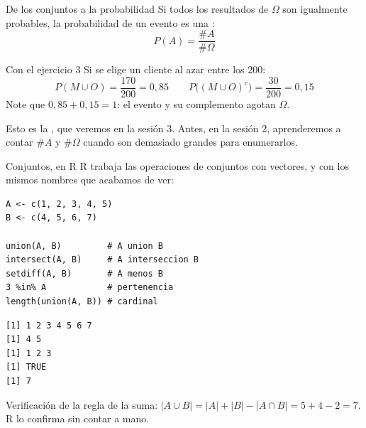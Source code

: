 \documentclass[aspectratio=169,10pt]{beamer}
\begin{document}
\begin{frame}{De los conjuntos a la probabilidad}
  Si todos los resultados de $\Omega$ son igualmente probables, la probabilidad
  de un evento es una :
  \[ P(A)=\frac{\#A}{\#\Omega} \]

  \vspace{0.2cm}
  \begin{exampleblock}{Con el ejercicio 3}
    \footnotesize Si se elige un cliente al azar entre los 200:
    \[ P(M\cup O)=\frac{170}{200}=0{,}85 \qquad
       P\big((M\cup O)^{c}\big)=\frac{30}{200}=0{,}15 \]
    Note que $0{,}85+0{,}15=1$: el evento y su complemento agotan $\Omega$.
  \end{exampleblock}

  \vspace{0.08cm}
  {\scriptsize\color{uniGris} Esto es la , que veremos
  en la sesión 3. Antes, en la sesión 2, aprenderemos a contar $\#A$ y
  $\#\Omega$ cuando son demasiado grandes para enumerarlos.}
\end{frame}

\begin{frame}[fragile]{Conjuntos, en R}
  \scriptsize
  R trabaja las operaciones de conjuntos con vectores, y con los mismos nombres
  que acabamos de ver:
\begin{lstlisting}[style=Rmini]
A <- c(1, 2, 3, 4, 5)
B <- c(4, 5, 6, 7)

union(A, B)         # A union B
intersect(A, B)     # A interseccion B
setdiff(A, B)       # A menos B
3 %in% A            # pertenencia
length(union(A, B)) # cardinal
\end{lstlisting}
\begin{lstlisting}[style=Rout]
[1] 1 2 3 4 5 6 7
[1] 4 5
[1] 1 2 3
[1] TRUE
[1] 7
\end{lstlisting}

  \vspace{-0.1cm}
  {\tiny\color{uniGris} Verificación de la regla de la suma:
  $|A \cup B| = |A| + |B| - |A \cap B| = 5 + 4 - 2 = 7$. R lo confirma sin
  contar a mano.}
\end{frame}
\end{document}
